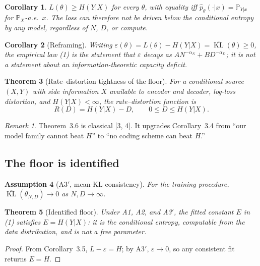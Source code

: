 \documentclass[12pt]{article}
\newcommand{\eps}{\varepsilon}
\newcommand{\KL}{\operatorname{KL}}
\newcommand{\Prob}{\mathbb{P}}
\newtheorem{theorem}{Theorem}[section]
\newtheorem{corollary}[theorem]{Corollary}
\newtheorem{assumption}[theorem]{Assumption}
\theoremstyle{remark}
\newtheorem{remark}{Remark}
\begin{document}
\begin{corollary}
\label{cor:floor}
$L(\theta)\ge H(Y|X)$ for every $\theta$, with equality iff
$\hat p_\theta(\cdot|x)=\Prob_{Y|x}$ for $\Prob_X$-a.e.\ $x$. The loss can
therefore not be driven below the conditional entropy by any model, regardless
of $N$, $D$, or compute.
\end{corollary}

\begin{corollary}[Reframing]
\label{cor:excess}
Writing $\eps(\theta)=L(\theta)-H(Y|X)=\overline{\KL}(\theta)\ge0$, the
empirical law (1) is the statement that $\eps$ decays as
$A N^{-\alpha_N}+B D^{-\alpha_D}$; it is \emph{not} a statement about
an information-theoretic capacity deficit.
\end{corollary}

\begin{theorem}[Rate--distortion tightness of the floor]
\label{thm:rd}
For a conditional source $(X,Y)$ with side information $X$ available to encoder
and decoder, log-loss distortion, and $H(Y|X)<\infty$, the rate--distortion
function is
\begin{equation}
  R(D)=H(Y|X)-D,\qquad 0\le D\le H(Y|X).
  \label{eq:rd}
\end{equation}
\end{theorem}
\begin{remark}
Theorem~3.6 is classical [3, 4]. It upgrades
Corollary~3.4 from ``our model family cannot beat $H$'' to
``no coding scheme can beat $H$.''
\end{remark}

\subsection{The floor is identified}
\begin{assumption}[A3$'$, mean-KL consistency]
\label{ass:consistent}
For the training procedure, $\overline{\KL}(\theta_{N,D})\to0$ as
$N,D\to\infty$.
\end{assumption}

\begin{theorem}[Identified floor]
\label{thm:identified}
Under A1, A2, and A3$'$, the fitted constant $E$ in (1) satisfies
$E=H(Y|X)$: it is the conditional entropy, computable from the data
distribution, and is not a free parameter.
\end{theorem}

\begin{proof}
From Corollary~3.5, $L-\eps=H$; by A3$'$, $\eps\to0$, so any
consistent fit returns $E=H$.
\end{proof}
\end{document}
